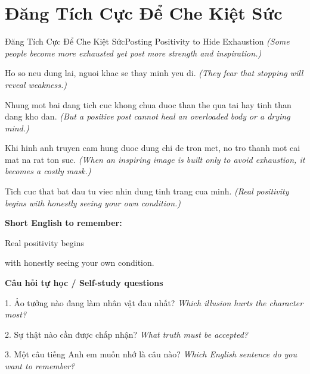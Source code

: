 \section{Đăng Tích Cực Để Che Kiệt Sức}
\begin{truyen}{Đăng Tích Cực Để Che Kiệt Sức}{Posting Positivity to Hide Exhaustion}
\textit{(Some people become more exhausted yet post more strength and inspiration.)}

Ho so neu dung lai, nguoi khac se thay minh yeu di.
\textit{(They fear that stopping will reveal weakness.)}

Nhung mot bai dang tich cuc khong chua duoc than the qua tai hay tinh than dang kho dan.
\textit{(But a positive post cannot heal an overloaded body or a drying mind.)}

Khi hinh anh truyen cam hung duoc dung chi de tron met, no tro thanh mot cai mat na rat ton suc.
\textit{(When an inspiring image is built only to avoid exhaustion, it becomes a costly mask.)}

\end{truyen}

\begin{baihoc}
Tich cuc that bat dau tu viec nhin dung tinh trang cua minh.
\textit{(Real positivity begins with honestly seeing your own condition.)}
\end{baihoc}

\begin{ghinhoanh}
\textbf{Short English to remember:}

Real positivity begins

with honestly seeing your own condition.

\end{ghinhoanh}

\begin{tuhocnhanh}
\textbf{Câu hỏi tự học / Self-study questions}

1. Ảo tưởng nào đang làm nhân vật đau nhất? \textit{Which illusion hurts the character most?}

2. Sự thật nào cần được chấp nhận? \textit{What truth must be accepted?}

3. Một câu tiếng Anh em muốn nhớ là câu nào? \textit{Which English sentence do you want to remember?}
\end{tuhocnhanh}
\ngancach

